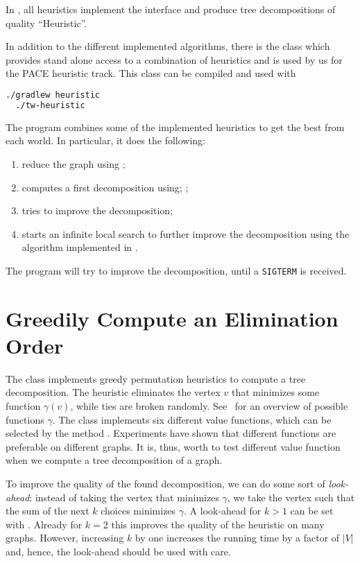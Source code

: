 \documentclass[a4paper, ukenglish, twoside, openright]{jdrasilmanual}
\begin{document}
In \Jdrasil{}, all heuristics implement the interface
 and produce tree decompositions of quality ``Heuristic''.

In addition to the different implemented algorithms, there is the
class  which provides stand alone access to a
combination of heuristics and is used by us for the PACE heuristic
track. This class can be compiled and used with
\begin{lstlisting}[language=bash]
  ./gradlew heuristic
  ./tw-heuristic
\end{lstlisting}
The program combines some of the implemented heuristics to get the
best from each world. In particular, it does the following:
\begin{enumerate}
  \item reduce the graph using ;
  \item computes a first decomposition using;
    ;
  \item tries to improve the decomposition;
  \item starts an infinite local search to further improve the
    decomposition using the algorithm implemented in .
\end{enumerate}
The program will try to improve the decomposition, until a
\texttt{SIGTERM} is received. 

\section{Greedily Compute an Elimination Order}
The class  implements greedy
permutation heuristics to compute a tree decomposition. The heuristic
eliminates the vertex $v$ that minimizes some function $\gamma(v)$,
while ties are broken randomly. See~\cite{bodlaender2010treewidth}
for an overview of possible functions $\gamma$. The class implements
six different value functions, which can be selected by the method
. Experiments have shown that different functions are
preferable on different graphs. It is, thus, worth to test different
value function when we compute a tree decomposition of a graph.

To improve the quality of the found decomposition, we can do some sort
of \emph{look-ahead}: instead of taking the vertex that minimizes
$\gamma$, we take the vertex such that the sum of the next $k$ choices
minimizes $\gamma$. A look-ahead for $k>1$ can be set with
. Already for $k=2$ this improves the quality of
the heuristic on many graphs. However, increasing $k$ by one increases
the running time by a factor of $|V|$ and, hence, the look-ahead
should be used with care.
\end{document}
